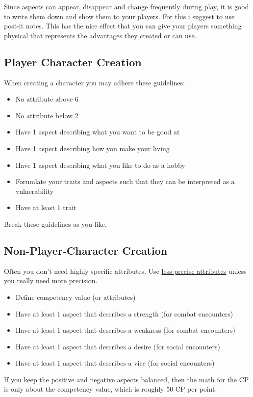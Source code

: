 \documentclass[11pt]{article}
\begin{document}
{Since aspects can appear, disappear and change frequently during play, it is good to write them down and show them to your players. For this i suggest to use post-it notes. This has the nice effect that you can give your players something physical that represents the advantages they created or can use.
\subsection{Player Character Creation}
\label{sec:org2c12e11}

When creating a character you may adhere these guidelines:
\begin{itemize}
\item No attribute above 6
\item No attribute below 2
\item Have 1 aspect describing what you want to be good at
\item Have 1 aspect describing how you make your living
\item Have 1 aspect describing what you like to do as a hobby
\item Forumlate your traits and aspects such that they can be interpreted as a vulnerability
\item Have at least 1 trait
\end{itemize}
Break these guidelines as you like.
\subsection{Non-Player-Character Creation}
\label{sec:org40045ba}

Often you don't need highly specific attributes. Use \hyperref[sec:orga4fb8d9]{less precise attributes} unless you really need more precision.
\begin{itemize}
\item Define competency value (or attributes)
\item Have at least 1 aspect that describes a strength (for combat encounters)
\item Have at least 1 aspect that describes a weakness (for combat encounters)
\item Have at least 1 aspect that describes a desire (for social encounters)
\item Have at least 1 aspect that describes a vice (for social encounters)
\end{itemize}
If you keep the positive and negative aspects balanced, then the math for the CP is only about the competency value, which is roughly 50 CP per point.
}
\end{document}
